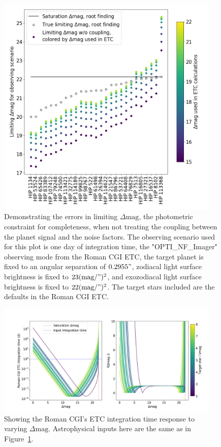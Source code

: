 \begin{figure}
  \begin{center}
    \includegraphics[width=0.95\textwidth]{ch2/figures/coupling.png}
  \end{center}
  \caption{Demonstrating the errors in limiting $\Delta\textrm{mag}$, the
  photometric constraint for completeness, when not treating the coupling
  between the planet signal and the noise factors. The observing scenario
  used for this plot is one day of integration time, the "OPTI\_NF\_Imager"
  observing mode from the Roman CGI ETC, the target planet is fixed to an
  angular separation of $0.2955"$, zodiacal light surface brightness is fixed to
  $23 (\textrm{mag}/")^2$, and exozodiacal light surface brightness is
  fixed to $22 (\textrm{mag}/")^2$. The target stars included are the defaults
  in the Roman CGI ETC.}
  \label{fig:CGI_coupling}
\end{figure}

\begin{figure}
  \begin{center}
    \includegraphics[width=0.95\textwidth]{ch2/figures/ETC_dMag_function.png}
  \end{center}
  \caption{Showing the Roman CGI's ETC integration time response to varying
  $\Delta\textrm{mag}$. Astrophysical inputs here are the same
  as in Figure~\ref{fig:CGI_coupling}.}
  \label{fig:ETC_dMag_function}
\end{figure}

